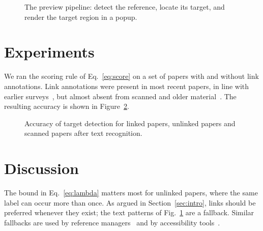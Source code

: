 \clearpage
\begin{figure}[H]
  \centering
  \caption{The preview pipeline: detect the reference, locate its target,
  and render the target region in a popup.}
  \label{fig:pipeline}
\end{figure}

\section{Experiments}\label{sec:experiments}

We ran the scoring rule of Eq.~\eqref{eq:score} on a set of papers with and
without link annotations. Link annotations were present in most recent
papers, in line with earlier surveys~\cite{survey}, but almost absent from
scanned and older material~\cite{scan,ocr}. The resulting accuracy is shown
in Figure~\ref{fig:accuracy}.

\begin{figure}[H]
  \centering
  \caption{Accuracy of target detection for linked papers, unlinked papers
  and scanned papers after text recognition.}
  \label{fig:accuracy}
\end{figure}

\section{Discussion}\label{sec:discussion}

The bound in Eq.~\eqref{eq:lambda} matters most for unlinked papers, where
the same label can occur more than once. As argued in
Section~\ref{sec:intro}, links should be preferred whenever they exist; the
text patterns of Fig.~\ref{fig:pipeline} are a fallback. Similar fallbacks
are used by reference managers~\cite{manager} and by accessibility
tools~\cite{access}.


